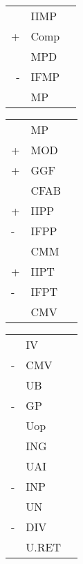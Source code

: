 \begin{Large}

\begin{multicols}{3}

\begin{Table}
\begin{tabular}{rll}
  & IIMP & \\
+ & Comp & \\ \hline
  & MPD  & \\
- & IFMP & \\ \hline
  & MP   &
\end{tabular}
\end{Table}

\columnbreak
	
\begin{Table}
\begin{tabular}{lll}
   & MP   & \\
+  & MOD  & \\
+  & GGF  & \\ \hline
   & CFAB & \\
+  & IIPP & \\
-  & IFPP & \\ \hline
   & CMM  & \\
+  & IIPT & \\
-  & IFPT & \\ \hline
   & CMV  &
\end{tabular}
\end{Table}

\columnbreak
\begin{Table}
\begin{tabular}{lll}
   & IV    & \\
-  & CMV   & \\ \hline
   & UB    & \\
-  & GP    & \\ \hline
   & Uop   & \\
   & ING   & \\ \hline
   & UAI   & \\
-  & INP   & \\ \hline
   & UN    & \\
-  & DIV   & \\ \hline
   & U.RET &
\end{tabular}
\end{Table}

\end{multicols}

\end{Large}

